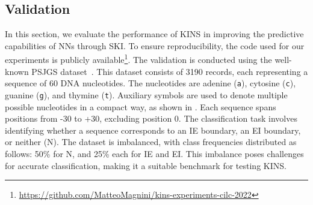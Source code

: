 \subsection{Validation}\label{subsec:kins-validation}
%

%
In this section, we evaluate the performance of \gls{KINS} in improving the predictive capabilities of \glspl{NN} through \gls{SKI}.
%
To ensure reproducibility, the code used for our experiments is publicly available\footnote{\url{https://github.com/MatteoMagnini/kins-experiments-cilc-2022}}.
%
The validation is conducted using the well-known \gls{PSJGS} dataset~\cite{splice-junction_gene_sequences_69}.
%
This dataset consists of 3190 records, each representing a sequence of 60 DNA nucleotides.
%
The nucleotides are adenine (\texttt{a}), cytosine (\texttt{c}), guanine (\texttt{g}), and thymine (\texttt{t}).
%
Auxiliary symbols are used to denote multiple possible nucleotides in a compact way, as shown in .
%
Each sequence spans positions from -30 to +30, excluding position 0.
%
The classification task involves identifying whether a sequence corresponds to an \gls{IE} boundary, an \gls{EI} boundary, or neither (N).
%
The dataset is imbalanced, with class frequencies distributed as follows: 50\% for N, and 25\% each for \gls{IE} and \gls{EI}.
%
This imbalance poses challenges for accurate classification, making it a suitable benchmark for testing \gls{KINS}.


